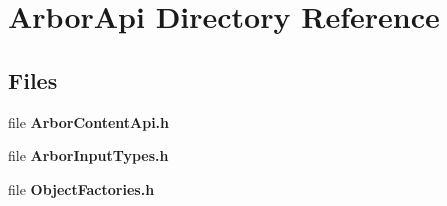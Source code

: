 \section{Arbor\+Api Directory Reference}
\label{dir_3a8459c8cdd8a27725773b18952501a7}
\subsection*{Files}
\begin{DoxyCompactItemize}
\item 
file {\bf Arbor\+Content\+Api.\+h}
\item 
file {\bf Arbor\+Input\+Types.\+h}
\item 
file {\bf Object\+Factories.\+h}
\end{DoxyCompactItemize}
